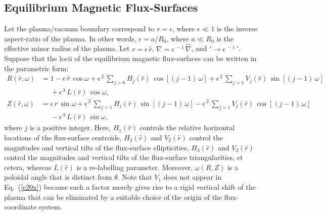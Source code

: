 \documentclass[12pt,prb,aps]{revtex4-1}
\begin{document}
\subsection{Equilibrium Magnetic Flux-Surfaces}
Let the plasma/vacuum boundary correspond to $r=\epsilon$, where $\epsilon\ll 1$ is the inverse aspect-ratio of the
plasma. In other words, $\epsilon=a/R_0$, where $a\ll R_0$ is the effective minor radius of the plasma. 
Let $r=\epsilon\,\hat{r}$, $\nabla =\epsilon^{\,-1}\,\hat{\nabla}$, and $'\rightarrow \epsilon^{\,-1}\,'$. 
Suppose that the locii of the equilibrium magnetic flux-surfaces can be written in the parametric form:\,\cite{con0,gim,am1,fitz2024}
\begin{align}
R(\hat{r},\omega) &= 1 -\epsilon\,\hat{r}\,\cos\omega + \epsilon^{\,2}\,\sum_{j>0}H_j(\hat{r})\,\cos[(j-1)\,\omega] + \epsilon^{\,2}\,\sum_{j>1}V_j(\hat{r})\,\sin[(j-1)\,\omega] \nonumber\\[0.5ex]
&\phantom{=}+\epsilon^{\,3}\,L(\hat{r})\,\cos\omega,\label{e19x}\\[0.5ex]
Z(\hat{r},\omega)&= \epsilon\,\hat{r}\,\sin\omega +\epsilon^{\,2}\,\sum_{j>1}H_j(\hat{r})\,\sin[(j-1)\,\omega]
-\epsilon^{\,2}\,\sum_{j>1}V_j(\hat{r})\,\cos[(j-1)\,\omega]\nonumber\\[0.5ex]&\phantom{=}-\epsilon^{\,3}\,L(\hat{r})\,\sin\omega,\label{e20x}
\end{align}
where $j$ is a positive integer. 
Here, $H_1(\hat{r})$  controls the relative horizontal locations of the flux-surface centroids, $H_2(\hat{r})$ and $V_2(\hat{r})$ control the 
magnitudes and vertical tilts of the flux-surface ellipticities, $H_3(\hat{r})$ and
$V_3(\hat{r})$ control the magnitudes and vertical tilts of the flux-surface triangularities, et cetera, whereas $L(\hat{r})$ is a
re-labelling parameter. Moreover, $\omega(R,Z)$ is a  poloidal angle that is distinct from $\theta$. Note that $V_1$ does not appear in Eq.~(\ref{e20x})
because such a factor merely gives rise to a rigid vertical shift of the plasma that can be eliminated by a suitable choice of the
origin of the flux-coordinate system.\cite{fitz2024}
\end{document}
